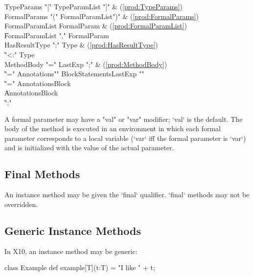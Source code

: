 \begin{bbgrammar}
          TypeParams \: \xcd"[" TypeParamList \xcd"]" & (\ref{prod:TypeParams}) \\
        FormalParams \: \xcd"(" FormalParamList\opt \xcd")" & (\ref{prod:FormalParams}) \\
     FormalParamList \: FormalParam & (\ref{prod:FormalParamList}) \\
                    \| FormalParamList \xcd"," FormalParam \\
       HasResultType \: \xcd":" Type & (\ref{prod:HasResultType}) \\
                    \| \xcd"<:" Type \\
          MethodBody \: \xcd"=" LastExp \xcd";" & (\ref{prod:MethodBody}) \\
                    \| \xcd"=" Annotations\opt \xcd"{" BlockStatements\opt LastExp \xcd"}" \\
                    \| \xcd"=" Annotations\opt Block \\
                    \| Annotations\opt Block \\
                    \| \xcd";" \\
\end{bbgrammar}


A formal parameter may have a \xcd"val" or \xcd"var"
modifier; \xcd`val` is the default.
The body of the method is executed in an environment in which 
each formal parameter corresponds to a local variable (\xcd`var` iff the
formal parameter is \xcd`var`)
and is initialized with the value of the actual parameter.

\subsection{Final Methods}
An instance method may be given the \xcd`final` qualifier.  \xcd`final`
methods may not be overridden.

\subsection{Generic Instance Methods}

\limitationx{}
In X10, an instance method may be generic: 
\begin{xten}
class Example {
  def example[T](t:T) = "I like " + t;
}
\end{xten}
%

